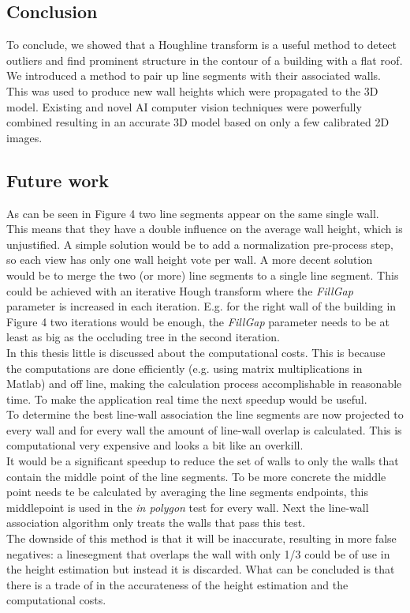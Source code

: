 
\subsection{Conclusion}


To conclude, we showed that a Houghline transform is a useful method to detect outliers and find prominent structure in the contour of a building with a flat roof. We introduced a method to pair up line segments with their associated walls. This was used to produce new wall heights which were propagated to the 3D model.
Existing and novel AI computer vision techniques were powerfully combined resulting in an accurate 3D model based on only a few calibrated 2D images. 

\subsection{Future work}
As can be seen in Figure 4
two line segments appear on the same single wall. This means that they have a double
influence on the average wall height, which is unjustified. 
A simple solution would be to add a normalization pre-process step, so each view
has only one wall height vote per wall. A more decent solution would be to
merge the two (or more) line segments to a single line segment. This could be
achieved with an iterative Hough transform where the \emph{FillGap} parameter is
increased in each iteration. E.g. for the right wall of the building in Figure 4  %
two iterations would be enough, the \emph{FillGap} parameter needs to be at least as big as the occluding tree in the second iteration.\\

In this thesis little is discussed about the computational costs. This is
because the computations are done efficiently (e.g. using matrix multiplications
in Matlab) and off line, making the calculation process accomplishable in reasonable time.
To make the application real time the next speedup would be useful.\\
To determine the best line-wall association the line segments are now projected to
every wall and for every wall the amount of line-wall overlap is calculated. This
is computational very expensive and looks a bit like an overkill.\\
It would be a significant speedup to reduce the set of walls to only the walls
that contain the middle point of the line segments. To be more concrete the
middle point needs te be calculated by averaging the line segments endpoints,
this middlepoint is used in the \emph{in polygon} test for every wall.  Next the
line-wall association algorithm only treats the walls that pass this test.\\
The downside of this method is that it will be inaccurate, resulting in more false
negatives: a linesegment that overlaps the wall with only 1/3 could be of
use in the height estimation but instead it is discarded.
What can be concluded is that there is a trade of in the accurateness of the
height estimation and the computational costs.


